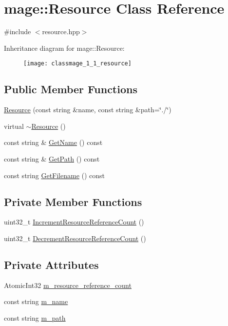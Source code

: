 \hypertarget{classmage_1_1_resource}{}\section{mage\+:\+:Resource Class Reference}
\label{classmage_1_1_resource}


{\ttfamily \#include $<$resource.\+hpp$>$}

Inheritance diagram for mage\+:\+:Resource\+:\begin{figure}[H]
\begin{center}
\leavevmode
\texttt{[image: classmage\_1\_1\_resource]}
\end{center}
\end{figure}
\subsection*{Public Member Functions}
\begin{DoxyCompactItemize}
\item 
\hyperlink{classmage_1_1_resource_a7b4febc86646d51ac116732af01abcaf}{Resource} (const string \&name, const string \&path=\char`\"{}./\char`\"{})
\item 
virtual \hyperlink{classmage_1_1_resource_a80112db991a7dfd1dc0b24967981ac60}{$\sim$\+Resource} ()
\item 
const string \& \hyperlink{classmage_1_1_resource_a77713b0c74f8983afc2d42843afe8cbe}{Get\+Name} () const
\item 
const string \& \hyperlink{classmage_1_1_resource_a2ef6c6937947b56cbabc569e3a63ca71}{Get\+Path} () const
\item 
const string \hyperlink{classmage_1_1_resource_a3235bf2744390d5957b9b4038e4bb512}{Get\+Filename} () const
\end{DoxyCompactItemize}
\subsection*{Private Member Functions}
\begin{DoxyCompactItemize}
\item 
uint32\+\_\+t \hyperlink{classmage_1_1_resource_a0aee4b36717494677dbd6ba799f11ab4}{Increment\+Resource\+Reference\+Count} ()
\item 
uint32\+\_\+t \hyperlink{classmage_1_1_resource_a225b37285aa32d893a07d5b492ea99f9}{Decrement\+Resource\+Reference\+Count} ()
\end{DoxyCompactItemize}
\subsection*{Private Attributes}
\begin{DoxyCompactItemize}
\item 
Atomic\+Int32 \hyperlink{classmage_1_1_resource_aa71f1ecac3436591032d2abd6a2f5c37}{m\+\_\+resource\+\_\+reference\+\_\+count}
\item 
const string \hyperlink{classmage_1_1_resource_a93019b74e9665195f1af17c60b6d171a}{m\+\_\+name}
\item 
const string \hyperlink{classmage_1_1_resource_a983470902250a8d16b6d5d01c332804b}{m\+\_\+path}
\end{DoxyCompactItemize}
